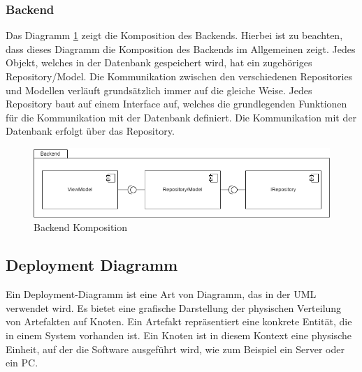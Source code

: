 \subsubsection{Backend}
Das Diagramm \ref*{fig:BackendKomposition} zeigt die Komposition des Backends. Hierbei ist zu beachten, dass dieses Diagramm die Komposition des Backends im Allgemeinen zeigt. Jedes Objekt, welches in der Datenbank gespeichert wird, hat ein zugehöriges Repository/Model. Die Kommunikation zwischen den verschiedenen Repositories und Modellen verläuft grundsätzlich immer auf die gleiche Weise. Jedes Repository baut auf einem Interface auf, welches die grundlegenden Funktionen für die Kommunikation mit der Datenbank definiert. Die Kommunikation mit der Datenbank erfolgt über das Repository.
\begin{figure}[H]
    \centering
    \includegraphics[width=0.\textwidth]{images/diagramme/Backend.png}
    \caption{Backend Komposition}
    \label{fig:BackendKomposition}
\end{figure}
\newpage
\subsection{Deployment Diagramm} \label{Deployment Diagramm}
Ein Deployment-Diagramm ist eine Art von Diagramm, das in der \ac{UML} verwendet wird. Es bietet eine grafische Darstellung der physischen Verteilung von Artefakten auf Knoten. Ein Artefakt repräsentiert eine konkrete Entität, die in einem System vorhanden ist. Ein Knoten ist in diesem Kontext eine physische Einheit, auf der die Software ausgeführt wird, wie zum Beispiel ein Server oder ein PC.\newline

